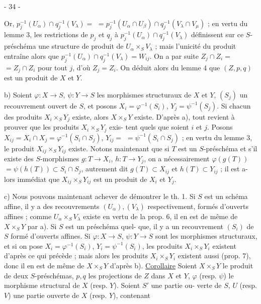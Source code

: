 \newpage


- 34 -

 Or, $p_j^{-1}(U_\alpha) \cap q_j^{-1}(V_\lambda) =$
$= p_j^{-1}(U_\alpha \cap U_\beta) \cap q_j^{-1}(V_\lambda \cap V_\mu)$ ; en vertu du lemme 3, les restrictions
de $p_j$ et $q_j$ à $p_j^{-1}(U_\alpha) \cap q_j^{-1}(V_\lambda)$ définissent sur ce $S$-préschéma une
structure de produit de $U_\alpha \times_S V_\lambda$ ; mais l'unicité du produit
entraîne alors que $p_j^{-1}(U_\alpha) \cap q_j^{-1}(V_\lambda) = W_{ij}$. On a par suite $Z_j \cap Z_i =$
$= Z_j \cap Z_i$ pour tout $j$, d'où $Z_j = Z_i$. On déduit alors du lemme 4 que
$(Z, p, q)$ est un produit de $X$ et $Y$.

b) Soient $\varphi : X \to S$, $\psi : Y \to S$ les morphismes structuraux de $X$ et $Y$,
$(S_j)$ un recouvrement ouvert de $S$, et posons $X_i = \varphi^{-1}(S_i)$, $Y_j = \psi^{-1}(S_j)$.
Si chacun des produits $X_i \times_S Y_j$ existe, alors $X \times_S Y$ existe.
D'après a), tout revient à prouver que les produits $X_i \times_S Y_j$ exis-
tent quels que soient $i$ et $j$. Posons $X_{ij} = X_i \cap X_j = \varphi^{-1}(S_i \cap S_j)$, $Y_{ij} =$
$= \psi^{-1}(S_i \cap S_j)$ ; en vertu du lemme 3, le produit $X_{ij} \times_S Y_{ij}$
existe. Notons maintenant que si $T$ est un $S$-préschéma et s'il existe
des $S$-morphismes $g : T \to X_i$, $h : T \to Y_j$, on a nécessairement $\varphi(g(T))$
$= \psi(h(T)) \subset S_i \cap S_j$, autrement dit $g(T) \subset X_{ij}$ et $h(T) \subset Y_{ij}$ ; il est a-
lors immédiat que $X_{ij} \times_S Y_{ij}$ est un produit de $X_i$ et $Y_j$.

c) Nous pouvons maintenant achever de démontrer le th. 1. Si $S$ est
un schéma affine, il y a des recouvrements $(U_\alpha), (V_\lambda)$ respectivement,
formés d'ouverts affines ; comme $U_\alpha \times_S V_\lambda$ existe en vertu de la prop.
6, il en est de même de $X \times_S Y$ par a). Si $S$ est un préschéma quel-
que, il y a un recouvrement $(S_i)$ de $S$ formé d'ouverts affines. Si
$\varphi : X \to S$, $\psi : Y \to S$ sont les morphismes structuraux, et si on pose
$X_i = \varphi^{-1}(S_i)$, $Y_i = \psi^{-1}(S_i)$, les produits $X_i \times_S Y_i$ existent d'après ce
qui précède ; mais alors les produits $X_i \times_S Y_i$ existent aussi (prop.
7), donc il en est de même de $X \times_S Y$ d'après b).
\underline{Corollaire}
 Soient $X \times_S Y$ le produit
de deux $S$-préschémas, $p, q$ les projections de $Z$ dans $X$ et $Y$, $\varphi$ (resp.
$\psi$) le morphisme structural de $X$ (resp. $Y$). Soient $S'$ une partie ou-
verte de $S$, $U$ (resp. $V$) une partie ouverte de $X$ (resp. $Y$), contenant

